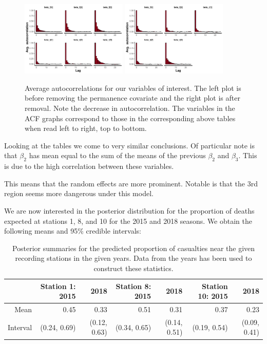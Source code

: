 \documentclass[10pt]{extarticle}
\begin{document}
\begin{figure}[H]
	\centering
	\includegraphics[width = 0.45\textwidth]{../acf_region}
	\includegraphics[width = 0.45\textwidth]{../acf_region_ns}
	\caption{Average autocorrelations for our variables of interest. The left plot is before removing the permanence covariate and the right plot is after removal. Note the decrease in autocorrelation. The variables in the ACF graphs correspond to those in the corresponding above tables when read left to right, top to bottom.}
	\label{fig:acfregional}
\end{figure}

Looking at the tables we come to very similar conclusions. Of particular note is that $\beta_2$ has mean equal to the sum of the means of the previous $\beta_2$ and $\beta_3$. This is due to the high correlation between these variables. 

This means that the random effects are more prominent. Notable is that the 3rd region seems more dangerous under this model. 

We are now interested in the posterior distribution for the proportion of deaths expected at stations 1, 8, and 10 for the 2015 and 2018 seasons. We obtain the following means and 95\% credible intervals:

\begin{table}[ht]
	\centering
	\footnotesize
	\begin{tabular}{r|rr|rr|rr}
			\hline
			& Station 1: 2015 & 2018 & Station 8: 2015 & 2018 & Station 10: 2015 & 2018 \\
			\hline
			Mean & 0.45 & 0.33 & 0.51 & 0.31 & 0.37 & 0.23 \\
			Interval & (0.24, 0.69) & (0.12, 0.63) & (0.34, 0.65) & (0.14, 0.51) & (0.19, 0.54) & (0.09, 0.41)\\
			\hline
	\end{tabular}
\caption{Posterior summaries for the predicted proportion of casualties near the given recording stations in the given years. Data from the years has been used to construct these statistics.}
\label{tab:postprop}
\end{table}
\end{document}
